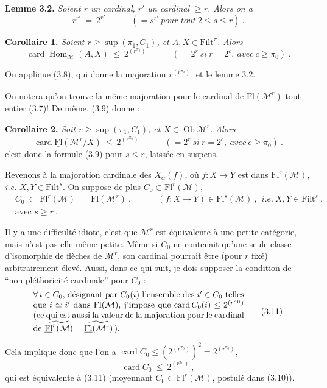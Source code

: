 \documentclass[11pt]{article}
\newcommand{\printedpage}[1]{\marginpar{\footnotesize p.~#1}}
\newcommand{\msp}[1]{\marginpar{\footnotesize [#1]}}
\newcommand{\M}{\mathcal{M}}
\newcommand{\Fl}{\mathrm{Fl}}
\newcommand{\uFl}{\underline{\mathrm{Fl}}}
\newcommand{\Filt}{\mathrm{Filt}}
\newcommand{\card}{\operatorname{card}}
\newcommand{\Hom}{\operatorname{Hom}}
\newcommand{\Ob}{\operatorname{Ob}}
\newcommand{\wavy}[1]{\widetilde{#1}}
\begin{document}
\textbf{Lemme 3.2.} \textit{Soient $r$ un cardinal, $r'$ un cardinal $\geq r$. Alors on a}
\[
r^{r'}\ =\ 2^{r'}\qquad\quad(=s^{r'}\ \textit{pour tout}\ 2\leq s\leq r)\ .
\]

\textbf{Corollaire 1.} \textit{Soient $r\geq\sup(\pi_1,C_1)$, et $A,X\in\Filt^\pi$. Alors}
\[
\card\Hom_{\M}(A,X)\ \leq\ 2^{(r^{\pi_0})}\qquad\quad(=2^r\ \textit{si}\ r=2^c,\ \textit{avec}\ c\geq\pi_0)\ . \tag*{(3.10)}
\]

On applique (3.8), qui donne la majoration $r^{(r^{\pi_0})}$, et le lemme 3.2.

On notera qu'on trouve la même majoration pour le cardinal de $\wavy{\uFl(\M^r)}$ tout entier (3.7)! De même, (3.9) donne :

\textbf{Corollaire 2.} \textit{Soit $r\geq\sup(\pi_1,C_1)$, et $X\in\Ob\M^r$. Alors}
\[
\card\wavy{\uFl(\M^r/X)}\ \leq\ 2^{(r^{\pi_0})}\qquad\quad(=2^r\ \textit{si}\ r=2^c,\ \textit{avec}\ c\geq\pi_0)\ . \tag*{(3.11)}
\]
c'est donc la formule (3.9) pour $s\leq r$, laissée en suspens.

\msp{page 24}
Revenons à la majoration cardinale des $X_\alpha(f)$, où $f : X\longrightarrow Y$ est dans $\Fl^s(\M)$, \textit{i.e.} $X,Y\in\Filt^s$. On suppose de plus $C_0\subset\Fl^r(\M)$,
\[
\begin{aligned}
&C_0\ \subset\ \Fl^r(\M)\ =\ \Fl(\M^r)\ ,\qquad\quad(f:X\longrightarrow Y)\in\Fl^s(\M)\ ,\ \ \textit{i.e.}\ X,Y\in\Filt^s\ ,\\
&\text{avec } s\geq r\ .
\end{aligned} \tag*{(3.10)}
\]

 Il y a une difficulté idiote, c'est que $\M^r$ est équivalente à une petite catégorie, mais n'est pas elle-même petite. Même si $C_0$ ne contenait qu'une seule classe d'isomorphie de flèches de $\M^r$, son cardinal pourrait être (pour $r$ fixé) arbitrairement élevé. Aussi, dans ce qui suit, je dois supposer la condition de “non pléthoricité cardinale” pour $C_0$ :
\[
\parbox{0.72\linewidth}{$\forall\,i\in C_0$, désignant par $C_0(i)$ l'ensemble des $i'\in C_0$ telles que $i\simeq i'$ dans $\Fl(\M)$, j'impose que $\card C_0(i)\leq 2^{(r^{\pi_0})}$ (ce qui est aussi la valeur de la majoration pour le cardinal de $\wavy{\uFl^r(\M)}=\wavy{\uFl(\M^r)}$\,).} \tag*{(3.11)}
\]

\printedpage{17}
 Cela implique donc que l'on a $\card C_0\leq(2^{(r^{\pi_0})})^2=2^{(r^{\pi_0})}$,
\[
\card C_0\ \leq\ 2^{(r^{\pi_0})}\ , \tag*{(3.12)}
\]
qui est équivalente à (3.11) (moyennant $C_0\subset\Fl^r(\M)$, postulé dans (3.10)).
\end{document}
